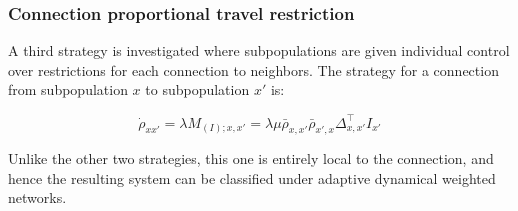 \subsubsection{Connection proportional travel restriction}

A third strategy is investigated where subpopulations are given individual control over restrictions for each connection to neighbors. The strategy for a connection from subpopulation $x$ to subpopulation $x'$ is:

\begin{equation}
\dot{\rho}_{xx'} = \lambda M_{(I);x,x'} = \lambda \mu \bar{\rho}_{x,x'} \bar{\rho}_{x',x} \Delta^{\top}_{x,x'} I_{x'}
\end{equation}

Unlike the other two strategies, this one is entirely local to the connection, and hence the resulting system can be classified under adaptive dynamical weighted networks\cite{berner2023adaptive}.\\

